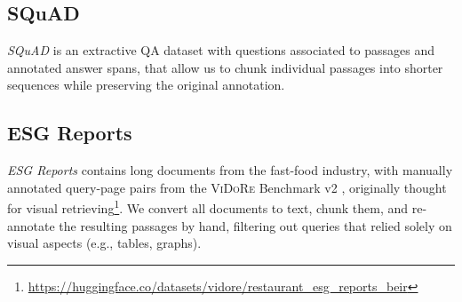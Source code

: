 \subsection{SQuAD}

\textit{SQuAD} is an extractive QA dataset with questions associated to passages and annotated answer spans, that allow us to chunk individual passages into shorter sequences while preserving the original annotation.

\subsection{ESG Reports}

\textit{ESG Reports} contains long documents from the fast-food industry, with manually annotated query-page pairs from the \textsc{ViDoRe} Benchmark v2 , originally thought for visual retrieving\footnote{\url{https://huggingface.co/datasets/vidore/restaurant_esg_reports_beir}}. We convert all documents to text, chunk them, and re-annotate the resulting passages by hand, filtering out queries that relied solely on visual aspects (e.g., tables, graphs).




